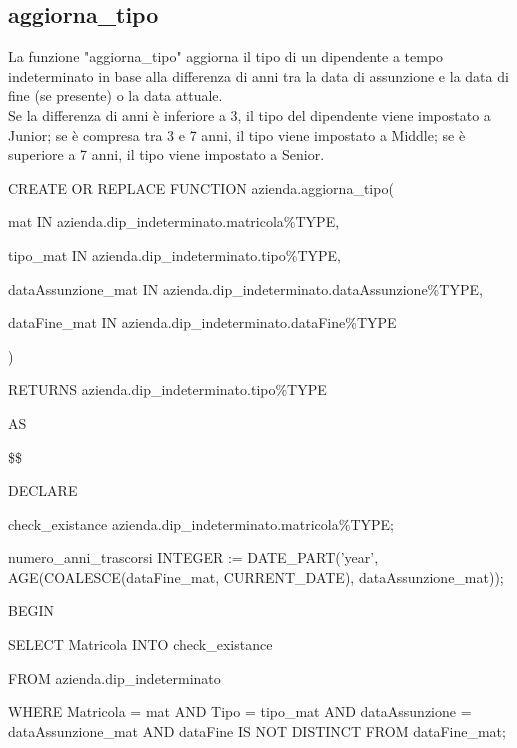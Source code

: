             \subsection{aggiorna\_tipo}
            La funzione "aggiorna\_tipo" aggiorna il tipo di un dipendente a tempo indeterminato in base alla differenza di anni tra la data di assunzione e la data di fine (se presente) o la data attuale.\\
            Se la differenza di anni è inferiore a 3, il tipo del dipendente viene impostato a Junior; se è compresa tra 3 e 7 anni, il tipo viene impostato a Middle; se è superiore a 7 anni, il tipo viene impostato a Senior.
                \ttfamily
                    \begin{flushleft}
                        \begin{description}
                            \item CREATE OR REPLACE FUNCTION azienda.aggiorna\_tipo(
                            \begin{description}
                                \item mat IN azienda.dip\_indeterminato.matricola\%TYPE,
                                \item tipo\_mat IN azienda.dip\_indeterminato.tipo\%TYPE,
                                \item dataAssunzione\_mat IN azienda.dip\_indeterminato.dataAssunzione\%TYPE,
                                \item dataFine\_mat IN azienda.dip\_indeterminato.dataFine\%TYPE
                            \end{description}
                            ) 
                            \item RETURNS azienda.dip\_indeterminato.tipo\%TYPE      
                            \item AS
                            \item \$\$
                            \item DECLARE
                            \begin{description}
                                \item check\_existance azienda.dip\_indeterminato.matricola\%TYPE;
                                \item numero\_anni\_trascorsi INTEGER := DATE\_PART('year', AGE(COALESCE(dataFine\_mat, CURRENT\_DATE), dataAssunzione\_mat));
                            \end{description}
                            \item BEGIN 
                                \begin{description}
                                    \item SELECT Matricola INTO check\_existance
                                    \item FROM azienda.dip\_indeterminato
                                    \item WHERE Matricola = mat AND Tipo = tipo\_mat AND dataAssunzione = dataAssunzione\_mat AND dataFine IS NOT DISTINCT FROM dataFine\_mat;
                                    

\end{description}
\end{description}
\end{flushleft}
